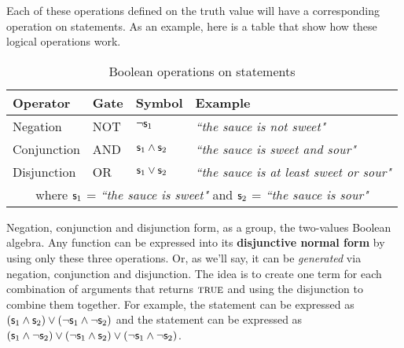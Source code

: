 \documentclass[11pt,letterpaper,fleqn]{memoir} %
\begin{document}
Each of these operations defined on the truth value will have a corresponding operation on statements. As an example, here is a table that show how these logical operations work.
\begin{table}[h]
	\centering
	\begin{tabular}{p{} p{} p{} p{}}
		Operator & Gate & Symbol & Example \\ 
		\hline 
		Negation & NOT & $\neg \mathsf{s}_1$ &  \emph{``the sauce is not sweet"} \\ 
		Conjunction & AND & $\mathsf{s}_1 \wedge \mathsf{s}_2$ & \emph{``the sauce is sweet and sour"} \\ 
		Disjunction & OR & $\mathsf{s}_1 \vee \mathsf{s}_2$ & \emph{``the sauce is at least sweet or sour"}\\
		\multicolumn{4}{c}{  where $\mathsf{s}_1$ = \emph{``the sauce is sweet"} and $\mathsf{s}_2$ = \emph{``the sauce is sour"}}
	\end{tabular} 
	\caption{Boolean operations on statements}
\end{table}

Negation, conjunction and disjunction form, as a group, the two-values Boolean algebra. Any function can be expressed into its \textbf{disjunctive normal form} by using only these three operations. Or, as we'll say, it can be \emph{generated} via negation, conjunction and disjunction. The idea is to create one term for each combination of arguments that returns $\textsc{true}$ and using the disjunction to combine them together. For example, the statement  can be expressed as $(\mathsf{s}_1 \wedge \mathsf{s}_2) \vee (\neg \mathsf{s}_1 \wedge \neg \mathsf{s}_2)$ and the statement  can be expressed as $(\mathsf{s}_1 \wedge \neg \mathsf{s}_2) \vee (\neg \mathsf{s}_1 \wedge \mathsf{s}_2) \vee (\neg \mathsf{s}_1 \wedge \neg \mathsf{s}_2)$.
\end{document}
